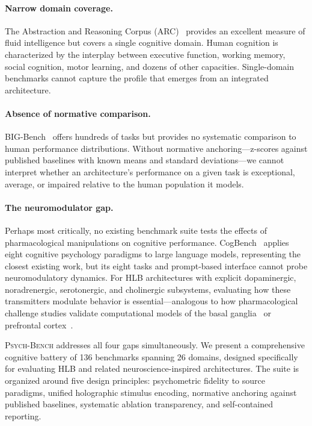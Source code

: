 \documentclass[11pt,letterpaper]{article}
\newcommand{\psychbench}{\textsc{Psych-Bench}}
\newcommand{\hlb}{\textsc{HLB}}
\begin{document}
\paragraph{Narrow domain coverage.} The Abstraction and Reasoning Corpus (ARC)~\citep{chollet2019measure} provides an excellent measure of fluid intelligence but covers a single cognitive domain. Human cognition is characterized by the interplay between executive function, working memory, social cognition, motor learning, and dozens of other capacities. Single-domain benchmarks cannot capture the profile that emerges from an integrated architecture.

\paragraph{Absence of normative comparison.} BIG-Bench~\citep{srivastava2023beyond} offers hundreds of tasks but provides no systematic comparison to human performance distributions. Without normative anchoring---z-scores against published baselines with known means and standard deviations---we cannot interpret whether an architecture's performance on a given task is exceptional, average, or impaired relative to the human population it models.

\paragraph{The neuromodulator gap.} Perhaps most critically, no existing benchmark suite tests the effects of pharmacological manipulations on cognitive performance. CogBench~\citep{codaforno2024cogbench} applies eight cognitive psychology paradigms to large language models, representing the closest existing work, but its eight tasks and prompt-based interface cannot probe neuromodulatory dynamics. For \hlb{} architectures with explicit dopaminergic, noradrenergic, serotonergic, and cholinergic subsystems, evaluating how these transmitters modulate behavior is essential---analogous to how pharmacological challenge studies validate computational models of the basal ganglia~\citep{doya2002metalearning} or prefrontal cortex~\citep{arnsten2011catecholamine}.

\psychbench{} addresses all four gaps simultaneously. We present a comprehensive cognitive battery of 136 benchmarks spanning 26 domains, designed specifically for evaluating \hlb{} and related neuroscience-inspired architectures. The suite is organized around five design principles: psychometric fidelity to source paradigms, unified holographic stimulus encoding, normative anchoring against published baselines, systematic ablation transparency, and self-contained reporting.
\end{document}
